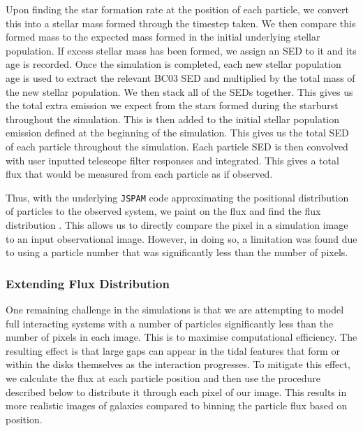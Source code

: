 Upon finding the star formation rate at the position of each particle, we convert this into a stellar mass formed through the timestep taken. We then compare this formed mass to the expected mass formed in the initial underlying stellar population. If \DIFdelbegin {}\DIFdelend excess stellar mass has been formed, we assign an SED to it and its age is recorded. Once the simulation is completed, each new stellar population age is used to extract the relevant BC03 SED and multiplied by the total mass of the new stellar population. We then stack all of the SEDs together. This gives us the total extra emission we expect from the stars formed during the starburst throughout the simulation. This is then added to the initial stellar population emission defined at the beginning of the simulation. This gives us the total SED of each particle throughout the simulation. Each particle SED is then convolved with user inputted telescope filter responses and integrated. This gives a total flux that would be measured from each particle as if observed. 

Thus, \DIFaddbegin {}\DIFaddend with the underlying \texttt{JSPAM} code approximating the positional distribution of particles to the observed system, \DIFdelbegin {}\texttt{} %
\DIFdelend we paint on the flux and find the flux distribution \DIFaddbegin {}\texttt{}\DIFaddend . This allows us to directly compare the pixel in a simulation image to an input observational image. However, in doing so, a limitation was found due to using a particle number that was significantly less than the number of pixels.

\subsubsection{Extending Flux Distribution}\label{flux_dist}
\noindent One remaining challenge in the simulations is that we are attempting to model full interacting systems with a number of particles significantly less than the number of pixels in each image. This is to maximise computational efficiency. The resulting effect is that large gaps can appear in the tidal features that form or within the disks themselves as the interaction progresses. To mitigate this effect, we calculate the flux at each particle position and then use the procedure described below to distribute it through each pixel of our image. This results in more realistic images of galaxies compared to binning the particle flux based on position.

